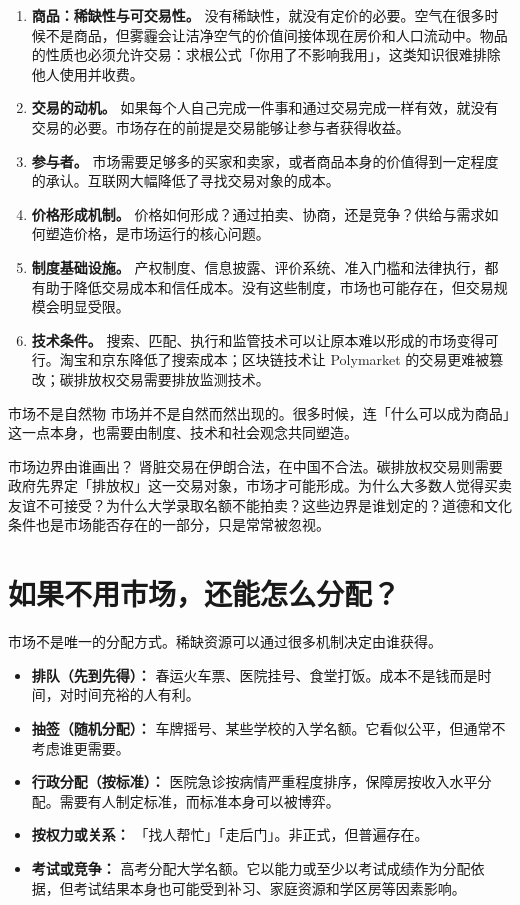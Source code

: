\documentclass[10pt,a4paper]{ctexart}
\begin{document}
\begin{enumerate}
  \item \textbf{商品：稀缺性与可交易性。} 没有稀缺性，就没有定价的必要。空气在很多时候不是商品，但雾霾会让洁净空气的价值间接体现在房价和人口流动中。物品的性质也必须允许交易：求根公式「你用了不影响我用」，这类知识很难排除他人使用并收费。
  \item \textbf{交易的动机。} 如果每个人自己完成一件事和通过交易完成一样有效，就没有交易的必要。市场存在的前提是交易能够让参与者获得收益。
  \item \textbf{参与者。} 市场需要足够多的买家和卖家，或者商品本身的价值得到一定程度的承认。互联网大幅降低了寻找交易对象的成本。
  \item \textbf{价格形成机制。} 价格如何形成？通过拍卖、协商，还是竞争？供给与需求如何塑造价格，是市场运行的核心问题。
  \item \textbf{制度基础设施。} 产权制度、信息披露、评价系统、准入门槛和法律执行，都有助于降低交易成本和信任成本。没有这些制度，市场也可能存在，但交易规模会明显受限。
  \item \textbf{技术条件。} 搜索、匹配、执行和监管技术可以让原本难以形成的市场变得可行。淘宝和京东降低了搜索成本；区块链技术让 Polymarket 的交易更难被篡改；碳排放权交易需要排放监测技术。
\end{enumerate}

\begin{insightbox}{市场不是自然物}
市场并不是自然而然出现的。很多时候，连「什么可以成为商品」这一点本身，也需要由制度、技术和社会观念共同塑造。
\end{insightbox}

\begin{conceptbox}{市场边界由谁画出？}
肾脏交易在伊朗合法，在中国不合法。碳排放权交易则需要政府先界定「排放权」这一交易对象，市场才可能形成。为什么大多数人觉得买卖友谊不可接受？为什么大学录取名额不能拍卖？这些边界是谁划定的？道德和文化条件也是市场能否存在的一部分，只是常常被忽视。
\end{conceptbox}

\section{如果不用市场，还能怎么分配？}

市场不是唯一的分配方式。稀缺资源可以通过很多机制决定由谁获得。

\begin{itemize}
  \item \textbf{排队（先到先得）：} 春运火车票、医院挂号、食堂打饭。成本不是钱而是时间，对时间充裕的人有利。
  \item \textbf{抽签（随机分配）：} 车牌摇号、某些学校的入学名额。它看似公平，但通常不考虑谁更需要。
  \item \textbf{行政分配（按标准）：} 医院急诊按病情严重程度排序，保障房按收入水平分配。需要有人制定标准，而标准本身可以被博弈。
  \item \textbf{按权力或关系：} 「找人帮忙」「走后门」。非正式，但普遍存在。
  \item \textbf{考试或竞争：} 高考分配大学名额。它以能力或至少以考试成绩作为分配依据，但考试结果本身也可能受到补习、家庭资源和学区房等因素影响。
\end{itemize}
\end{document}
